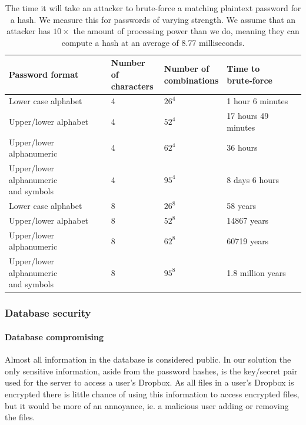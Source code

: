 \documentclass[12pt, titlepage]{article}
\begin{document}
\begin{center}
\begin{table}[h!]
    \begin{tabular}{ | l | l | l | l |}
    \hline
    \textbf{Password format} & \shortstack{\textbf{Number of} \\ \textbf{characters}} & \shortstack{\textbf{Number of} \\ \textbf{combinations}} & \shortstack{\textbf{Time to} \\ \textbf{brute-force}} \\ \hline
    Lower case alphabet  & 4 & $26^4$ & 1 hour 6 minutes \\ \hline
    Upper/lower alphabet  & 4 & $52^4$ & 17 hours 49 minutes \\ \hline
    Upper/lower alphanumeric & 4 & $62^4$ & 36 hours \\ \hline
    \shortstack{Upper/lower alphanumeric \\ and symbols}  & 4 & $95^4$ & 8 days 6 hours \\ \hline
    Lower case alphabet  & 8 & $26^8$ & 58 years \\ \hline
    Upper/lower alphabet  & 8 & $52^8$ & 14867 years \\ \hline
    Upper/lower alphanumeric & 8 & $62^8$ & 60719 years \\ \hline
    \shortstack{Upper/lower alphanumeric \\ and symbols}  & 8 & $95^8$ & 1.8 million years \\ \hline
    
    \end{tabular}
    \caption{The time it will take an attacker to brute-force a matching plaintext password for a hash. We measure this for passwords of varying strength. We assume that an attacker has $10 \times$ the amount of processing power than we do, meaning they can compute a hash at an average of 8.77 milliseconds.} \label{tab:passwordbruteforce}
    \end{table}
\end{center}

\subsubsection*{Database security}

\paragraph*{Database compromising} Almost all information in the database is considered public. In our solution the only sensitive information, aside from the password hashes, is the key/secret pair used for the server to access a user's Dropbox. As all files in a user's Dropbox is encrypted there is little chance of using this information to access encrypted files, but it would be more of an annoyance, ie. a malicious user adding or removing the files.
\end{document}
